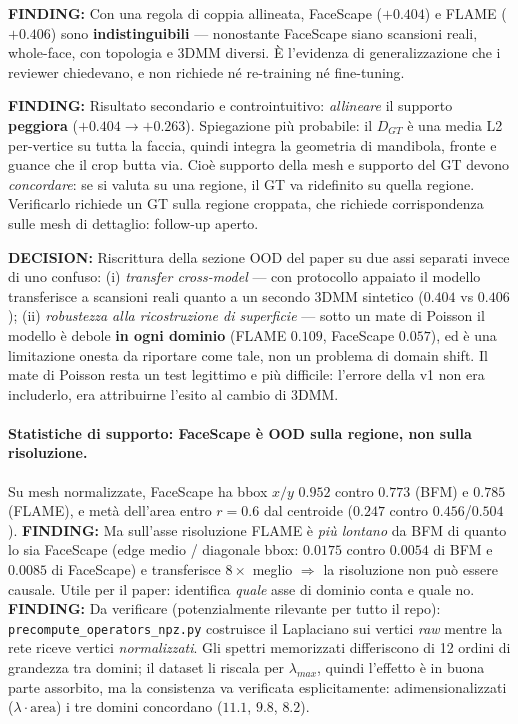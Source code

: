 \documentclass[11pt,a4paper]{article}
\newcommand{\finding}[1]{\textcolor{finding}{\textbf{FINDING:}} #1}
\newcommand{\decision}[1]{\textcolor{decision}{\textbf{DECISION:}} #1}
\begin{document}
\finding{Con una regola di coppia allineata, FaceScape ($+0.404$) e FLAME ($+0.406$) sono
\textbf{indistinguibili} --- nonostante FaceScape siano scansioni reali, whole-face,
con topologia e 3DMM diversi. \`E l'evidenza di generalizzazione che i reviewer chiedevano,
e non richiede n\'e re-training n\'e fine-tuning.}

\finding{Risultato secondario e controintuitivo: \emph{allineare} il supporto
\textbf{peggiora} ($+0.404 \to +0.263$). Spiegazione pi\`u probabile: il $D_{GT}$ \`e una
media L2 per-vertice su tutta la faccia, quindi integra la geometria di mandibola, fronte e
guance che il crop butta via. Cio\`e supporto della mesh e supporto del GT devono
\emph{concordare}: se si valuta su una regione, il GT va ridefinito su quella regione.
Verificarlo richiede un GT sulla regione croppata, che richiede corrispondenza sulle mesh
di dettaglio: follow-up aperto.}

\decision{Riscrittura della sezione OOD del paper su due assi separati invece di uno
confuso: (i) \emph{transfer cross-model} --- con protocollo appaiato il modello transferisce
a scansioni reali quanto a un secondo 3DMM sintetico ($0.404$ vs $0.406$); (ii)
\emph{robustezza alla ricostruzione di superficie} --- sotto un mate di Poisson il modello
\`e debole \textbf{in ogni dominio} (FLAME $0.109$, FaceScape $0.057$), ed \`e una
limitazione onesta da riportare come tale, non un problema di domain shift. Il mate di
Poisson resta un test legittimo e pi\`u difficile: l'errore della v1 non era includerlo,
era attribuirne l'esito al cambio di 3DMM.}

\paragraph{Statistiche di supporto: FaceScape \`e OOD sulla regione, non sulla risoluzione.}
Su mesh normalizzate, FaceScape ha bbox $x/y$ $0.952$ contro $0.773$ (BFM) e $0.785$
(FLAME), e met\`a dell'area entro $r=0.6$ dal centroide ($0.247$ contro $0.456$/$0.504$).
\finding{Ma sull'asse risoluzione FLAME \`e \emph{pi\`u lontano} da BFM di quanto lo sia
FaceScape (edge medio / diagonale bbox: $0.0175$ contro $0.0054$ di BFM e $0.0085$ di
FaceScape) e transferisce $8\times$ meglio $\Rightarrow$ la risoluzione non pu\`o essere
causale. Utile per il paper: identifica \emph{quale} asse di dominio conta e quale no.}
\finding{Da verificare (potenzialmente rilevante per tutto il repo):
\texttt{precompute\_operators\_npz.py} costruisce il Laplaciano sui vertici \emph{raw}
mentre la rete riceve vertici \emph{normalizzati}. Gli spettri memorizzati differiscono di
12 ordini di grandezza tra domini; il dataset li riscala per $\lambda_{max}$, quindi
l'effetto \`e in buona parte assorbito, ma la consistenza va verificata esplicitamente:
adimensionalizzati ($\lambda \cdot \text{area}$) i tre domini concordano ($11.1$, $9.8$,
$8.2$).}
\end{document}
